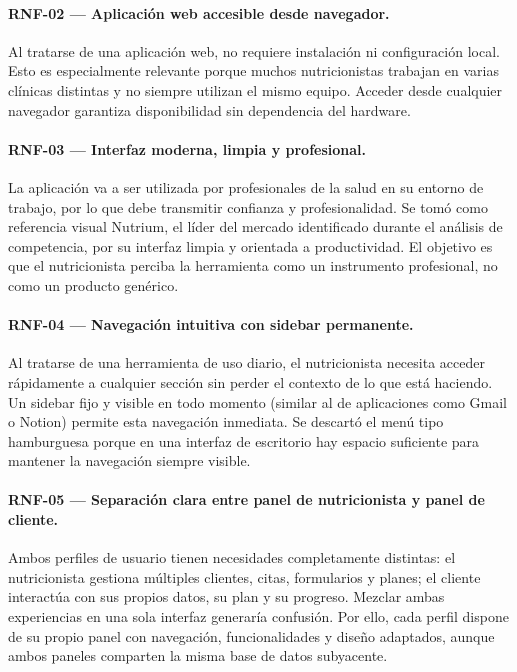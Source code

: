 \paragraph{RNF-02 --- Aplicación web accesible desde navegador.}
Al tratarse de una aplicación web, no requiere instalación ni configuración local. Esto es especialmente relevante porque muchos nutricionistas trabajan en varias clínicas distintas y no siempre utilizan el mismo equipo. Acceder desde cualquier navegador garantiza disponibilidad sin dependencia del hardware.

\paragraph{RNF-03 --- Interfaz moderna, limpia y profesional.}
La aplicación va a ser utilizada por profesionales de la salud en su entorno de trabajo, por lo que debe transmitir confianza y profesionalidad. Se tomó como referencia visual Nutrium, el líder del mercado identificado durante el análisis de competencia, por su interfaz limpia y orientada a productividad. El objetivo es que el nutricionista perciba la herramienta como un instrumento profesional, no como un producto genérico.

\paragraph{RNF-04 --- Navegación intuitiva con sidebar permanente.}
Al tratarse de una herramienta de uso diario, el nutricionista necesita acceder rápidamente a cualquier sección sin perder el contexto de lo que está haciendo. Un sidebar fijo y visible en todo momento (similar al de aplicaciones como Gmail o Notion) permite esta navegación inmediata. Se descartó el menú tipo hamburguesa porque en una interfaz de escritorio hay espacio suficiente para mantener la navegación siempre visible.

\paragraph{RNF-05 --- Separación clara entre panel de nutricionista y panel de cliente.}
Ambos perfiles de usuario tienen necesidades completamente distintas: el nutricionista gestiona múltiples clientes, citas, formularios y planes; el cliente interactúa con sus propios datos, su plan y su progreso. Mezclar ambas experiencias en una sola interfaz generaría confusión. Por ello, cada perfil dispone de su propio panel con navegación, funcionalidades y diseño adaptados, aunque ambos paneles comparten la misma base de datos subyacente.

